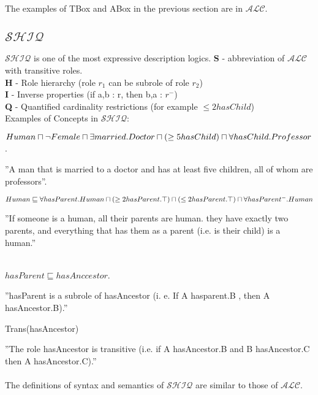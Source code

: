 The examples of TBox and ABox in the previous section are in $\mathcal{ALC}$.
\subsection{$\mathcal{SHIQ}$} 
\label{SHIQ}
$\mathcal{SHIQ}$ is one of the most expressive description logics.
\textbf{S} - abbreviation of \textbf{$\mathcal{ALC}$} with transitive roles. \\
\textbf{H} - Role hierarchy  (role $r_1$ can be subrole of role $r_2$)\\
\textbf{I} - Inverse properties   (if a,b : r, then b,a : $r^-$) \\
\textbf{Q} - Quantified cardinality restrictions  (for example $\leq 2  hasChild$)\\

Examples of Concepts in \textbf{$\mathcal{SHIQ}$}:
\begin{myex} \cite{handbook}
$ Human  \sqcap \neg Female \sqcap \exists married.Doctor \\
 \sqcap (\geq 5  hasChild) \sqcap \forall hasChild.Professor $ .
\end{myex}
''A man that is married to a doctor and has at least five
children, all of whom are professors''.
\begin{myex} \cite{handbook}
$Human \sqsubseteq \forall hasParent.Human \sqcap (\geq 2 hasParent.\top) \\
 \sqcap (\leq 2 hasParent.\top) 
\sqcap \forall hasParent^-.Human$
\end{myex}
''If someone is a human, all their parents are human. they have exactly two parents, and everything that has them as a parent (i.e. is their child) is a human.''
\begin{myex}
\label{rolehierarchy}
 \cite{handbook}\\
$hasParent \sqsubseteq hasAnccestor$.
\end{myex}
''hasParent is a subrole of hasAncestor (i. e. If A hasparent.B , then A hasAncestor.B).''
\begin{myex}
Trans(hasAncestor) 
\end{myex}
''The role hasAncestor is transitive (i.e. if A hasAncestor.B and B hasAncestor.C then A hasAncestor.C).'' \\
\\
The definitions of syntax and semantics of $\mathcal{SHIQ}$ are similar to those of $\mathcal{ALC}$.
